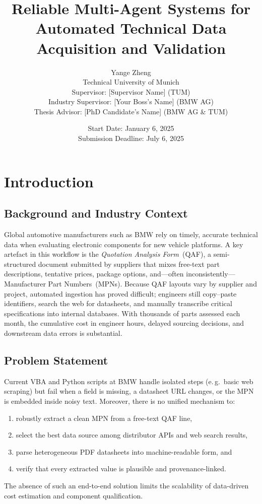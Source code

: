 \documentclass[11pt]{article}
\title{\textbf{Reliable Multi-Agent Systems for Automated Technical Data Acquisition and Validation}}
\author{
  Yange Zheng \\
  Technical University of Munich \\
  Supervisor: [Supervisor Name] (TUM) \\
  Industry Supervisor: [Your Boss's Name] (BMW AG) \\
  Thesis Advisor: [PhD Candidate's Name] (BMW AG \& TUM)
}
\date{Start Date: January 6, 2025 \\
Submission Deadline: July 6, 2025}
\begin{document}
\maketitle

\tableofcontents
\newpage

\section{Introduction}

\subsection{Background and Industry Context}
Global automotive manufacturers such as BMW rely on timely, accurate technical data when evaluating electronic components for new vehicle platforms.  
A key artefact in this workflow is the \emph{Quotation Analysis Form}~(QAF), a semi-structured document submitted by suppliers that mixes free-text part descriptions, tentative prices, package options, and—often inconsistently—Manufacturer Part Numbers~(MPNs).  
Because QAF layouts vary by supplier and project, automated ingestion has proved difficult; engineers still copy–paste identifiers, search the web for datasheets, and manually transcribe critical specifications into internal databases.  
With thousands of parts assessed each month, the cumulative cost in engineer hours, delayed sourcing decisions, and downstream data errors is substantial.

\subsection{Problem Statement}
Current VBA and Python scripts at BMW handle isolated steps (e.\,g.\ basic web scraping) but fail when a field is missing, a datasheet URL changes, or the MPN is embedded inside noisy text.  
Moreover, there is no unified mechanism to:  
\begin{enumerate}
  \item robustly extract a clean MPN from a free-text QAF line,
  \item select the best data source among distributor APIs and web search results,
  \item parse heterogeneous PDF datasheets into machine-readable form, and
  \item verify that every extracted value is plausible and provenance-linked.
\end{enumerate}
The absence of such an end-to-end solution limits the scalability of data-driven cost estimation and component qualification.
\end{document}
